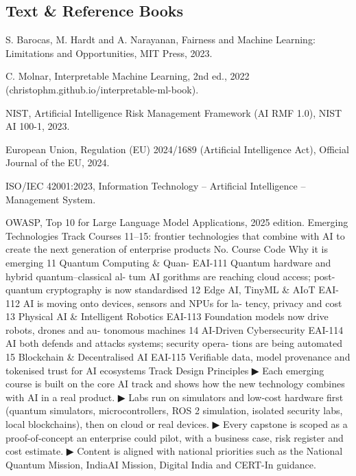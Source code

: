 \documentclass[10pt,a4paper]{article}
\begin{document}
\subsection*{Text \& Reference Books}{\footnotesize\begin{enumerate}[label={[\arabic*]}]
\item S. Barocas, M. Hardt and A. Narayanan, Fairness and Machine Learning: Limitations and Opportunities, MIT Press, 2023.
\item C. Molnar, Interpretable Machine Learning, 2nd ed., 2022 (christophm.github.io/interpretable-ml-book).
\item NIST, Artificial Intelligence Risk Management Framework (AI RMF 1.0), NIST AI 100-1, 2023.
\item European Union, Regulation (EU) 2024/1689 (Artificial Intelligence Act), Oﬀicial Journal of the EU, 2024.
\item ISO/IEC 42001:2023, Information Technology – Artificial Intelligence – Management System.
\item OWASP, Top 10 for Large Language Model Applications, 2025 edition. Emerging Technologies Track Courses 11–15: frontier technologies that combine with AI to create the next generation of enterprise products No. Course Code Why it is emerging 11 Quantum Computing \& Quan- EAI-111 Quantum hardware and hybrid quantum–classical al- tum AI gorithms are reaching cloud access; post-quantum cryptography is now standardised 12 Edge AI, TinyML \& AIoT EAI-112 AI is moving onto devices, sensors and NPUs for la- tency, privacy and cost 13 Physical AI \& Intelligent Robotics EAI-113 Foundation models now drive robots, drones and au- tonomous machines 14 AI-Driven Cybersecurity EAI-114 AI both defends and attacks systems; security opera- tions are being automated 15 Blockchain \& Decentralised AI EAI-115 Verifiable data, model provenance and tokenised trust for AI ecosystems Track Design Principles ▶ Each emerging course is built on the core AI track and shows how the new technology combines with AI in a real product. ▶ Labs run on simulators and low-cost hardware first (quantum simulators, microcontrollers, ROS 2 simulation, isolated security labs, local blockchains), then on cloud or real devices. ▶ Every capstone is scoped as a proof-of-concept an enterprise could pilot, with a business case, risk register and cost estimate. ▶ Content is aligned with national priorities such as the National Quantum Mission, IndiaAI Mission, Digital India and CERT-In guidance.
\end{enumerate}}
\end{document}
